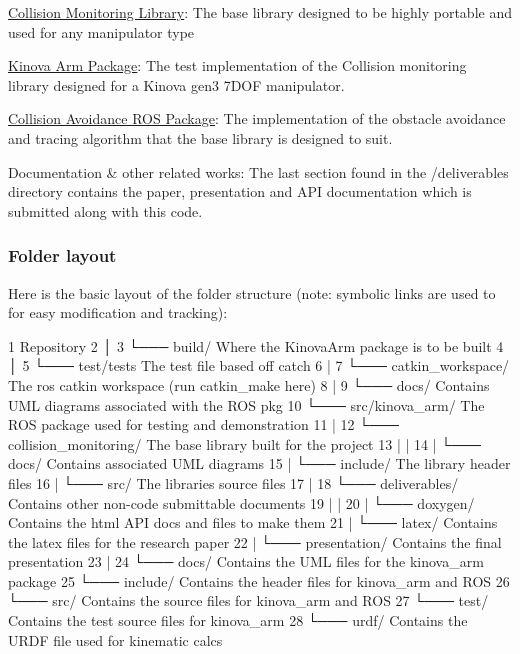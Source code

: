 \begin{DoxyItemize}
\item \hyperlink{collision__monitoring_2_r_e_a_d_m_e_8md_source}{Collision Monitoring Library}\+: The base library designed to be highly portable and used for any manipulator type
\item \hyperlink{md_src_README}{Kinova Arm Package}\+: The test implementation of the Collision monitoring library designed for a Kinova gen3 7\+D\+OF manipulator.
\item \hyperlink{md_catkin_workspace_README}{Collision Avoidance R\+OS Package}\+: The implementation of the obstacle avoidance and tracing algorithm that the base library is designed to suit.
\item Documentation \& other related works\+: The last section found in the /deliverables directory contains the paper, presentation and A\+PI documentation which is submitted along with this code.
\end{DoxyItemize}

\subsubsection*{Folder layout}

Here is the basic layout of the folder structure (note\+: symbolic links are used to for easy modification and tracking)\+:


\begin{DoxyCode}
1 Repository
2 │
3 └─── build/                    Where the KinovaArm package is to be built
4 │
5 └─── test/tests                The test file based off catch
6 |
7 └─── catkin\_workspace/         The ros catkin workspace (run catkin\_make here)
8 |
9 └─── docs/                     Contains UML diagrams associated with the ROS pkg
10 └─── src/kinova\_arm/           The ROS package used for testing and demonstration
11 |
12 └─── collision\_monitoring/     The base library built for the project
13 |   |
14 |   └─── docs/                 Contains associated UML diagrams
15 |   └─── include/              The library header files
16 |   └─── src/                  The libraries source files
17 |
18 └─── deliverables/             Contains other non-code submittable documents
19 |   |
20 |   └─── doxygen/              Contains the html API docs and files to make them
21 |   └─── latex/                Contains the latex files for the research paper
22 |   └─── presentation/         Contains the final presentation
23 |
24 └─── docs/                     Contains the UML files for the kinova\_arm package
25 └─── include/                  Contains the header files for kinova\_arm and ROS
26 └─── src/                      Contains the source files for kinova\_arm and ROS
27 └─── test/                     Contains the test source files for kinova\_arm
28 └─── urdf/                     Contains the URDF file used for kinematic calcs
\end{DoxyCode}


